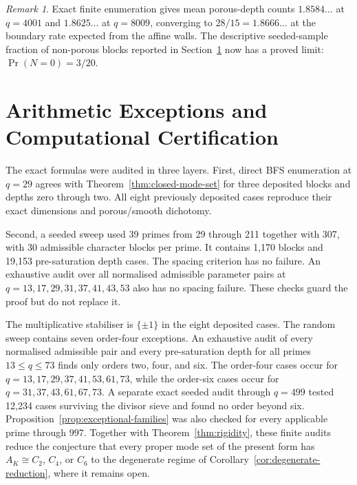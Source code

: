 \documentclass[11pt,a4paper]{article}
\theoremstyle{definition}
\theoremstyle{remark}
\newtheorem{remark}[theorem]{Remark}
\begin{document}
\begin{remark}
  \label{rem:porous-finite-checks}
  Exact finite enumeration gives mean porous-depth counts $1.8584\ldots$ at $q=4001$ and
  $1.8625\ldots$ at $q=8009$, converging to $28/15=1.8666\ldots$ at the boundary rate
  expected from the affine walls.
  The descriptive seeded-sample fraction of non-porous blocks reported in
  Section~\ref{sec:audit} now has a proved limit: $\Pr(N=0)=3/20$.
\end{remark}

\section{Arithmetic Exceptions and Computational Certification}
\label{sec:audit}

The exact formulas were audited in three layers.
First, direct BFS enumeration at $q=29$ agrees with
Theorem~\ref{thm:closed-mode-set} for three deposited blocks and depths zero through two.
All eight previously deposited cases reproduce their exact dimensions and porous/smooth
dichotomy.

Second, a seeded sweep used 39 primes from 29 through 211 together with 307, with 30
admissible character blocks per prime.
It contains 1,170 blocks and 19,153 pre-saturation depth cases.
The spacing criterion has no failure.
An exhaustive audit over all normalised admissible parameter pairs at
$q=13,17,29,31,37,41,43,53$ also has no spacing failure.
These checks guard the proof but do not replace it.

The multiplicative stabiliser is $\{\pm1\}$ in the eight deposited cases.
The random sweep contains seven order-four exceptions.
An exhaustive audit of every normalised admissible pair and every pre-saturation depth for
all primes $13\leq q\leq73$ finds only orders two, four, and six.
The order-four cases occur for
$q=13,17,29,37,41,53,61,73$, while the order-six cases occur for
$q=31,37,43,61,67,73$.
A separate exact seeded audit through $q=499$ tested 12,234 cases surviving the divisor
sieve and found no order beyond six.
Proposition~\ref{prop:exceptional-families} was also checked for every applicable prime
through $997$.
Together with Theorem~\ref{thm:rigidity}, these finite audits reduce the conjecture that
every proper mode set of the present form has $A_K\cong C_2$, $C_4$, or $C_6$ to the
degenerate regime of Corollary~\ref{cor:degenerate-reduction}, where it remains open.
\end{document}
